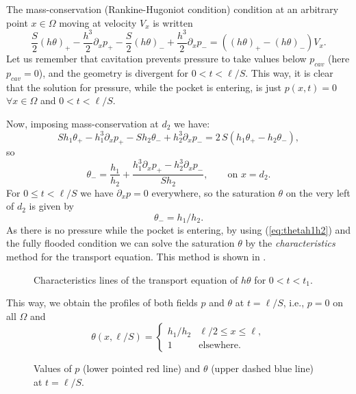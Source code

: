 The mass-conservation (Rankine-Hugoniot condition) condition at an arbitrary point $x\in\Omega$ moving at velocity $V_x$ is written
\begin{equation}
\frac{S}{2}\left(h\theta\right)_+-\frac{h^3}{2}\partial_xp_+-\frac{S}{2}\left(h\theta\right)_-+\frac{h^3}{2}\partial_xp_-=\left(\left(h\theta\right)_+-\left(h\theta\right)_-\right)V_x.\label{eq:massflux}
\end{equation}
Let us remember that cavitation prevents pressure to take values below $p_{cav}$ (here $p_{cav}=0$), and the geometry is divergent for $0<t<\ell/S$. This way, it is clear that the solution for pressure, while the pocket is entering, is just $p(x,t)=0$ $\forall x\in \Omega$ and $0<t<\ell/S$.

Now, imposing mass-conservation at $d_2$ we have:
\begin{equation*}
S h_1\theta_+-h_1^3\partial_xp_+-S h_2\theta_-+h_2^3\partial_xp_-=2\,S\left(h_1\theta_+-h_2\theta_-\right),
\end{equation*}
so
\begin{equation}
\theta_-=\frac{h_1}{h_2}+\frac{h_1^3\partial_xp_+-h^3_2\partial_xp_-}{S h_2},\qquad \text{on }x=d_2.
\end{equation}
For $0\leq t<\ell/S$ we have $\partial_x p =0$ everywhere, so the saturation $\theta$ on the very left of $d_2$ is given by
\begin{equation}
\theta_-=h_1/h_2.\label{eq:thetah1h2}
\end{equation}
As there is no pressure while the pocket is entering, by using (\ref{eq:thetah1h2}) and the fully flooded condition we can solve the saturation $\theta$ by the \emph{characteristics} method for the transport equation. This method is shown in .
\begin{figure}[ht!]
 \centering 
 \def\svgwidth{\textwidth}	

\caption[Characteristics lines of the transport equation of $h\theta$]{Characteristics lines of the transport equation of $h\theta$ for $0<t<t_1$.}\label{fig:pocket_char1}
\end{figure}

This way, we obtain the profiles of both fields $p$ and $\theta$ at $t=\ell/S$, i.e., $p=0$ on all $\Omega$ and
$$\theta(x,\ell/S)=\left\{\begin{array}{cl}
h_1/h_2 & \ell/2 \leq x\leq\ell,\\
1&\text{elsewhere}.
\end{array}\right.
$$
\begin{figure}[ht!]
 \centering 
 \def\svgwidth{\textwidth}

\caption[Initial conditions of $\theta$ and $p$ for the problem of a traveling pocket]{Values of $p$ (lower pointed red line) and $\theta$ (upper dashed blue line) at $t=\ell/S$.}\label{fig:esquema_interior_ea_t0}
\end{figure}


